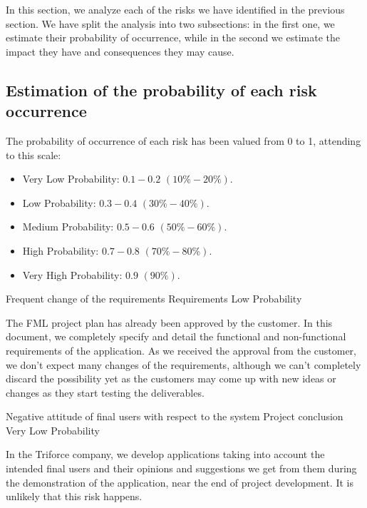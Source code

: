 
In this section, we analyze each of the risks we have identified in the previous section. We have split the analysis into two subsections: in the first one, we estimate their probability of occurrence, while in the second we estimate the impact they have and consequences they may cause.

\subsection{Estimation of the probability of each risk occurrence}
The probability of occurrence of each risk has been valued from 0 to 1, attending to this scale:
\begin{itemize}
\item Very Low Probability: $0.1-0.2$ $(10\%-20\%)$.
\item Low Probability: $0.3-0.4$ $(30\%-40\%)$.
\item Medium Probability: $0.5-0.6$ $(50\%-60\%)$.
\item High Probability: $0.7-0.8$ $(70\%-80\%)$.
\item Very High Probability: $0.9$ $(90\%)$.
\end{itemize}


\begin{risk}[riskReqChange]{Frequent change of the requirements}
\riskcat Requirements
 Low Probability

The FML project plan has already been approved by the customer. In this document, we completely specify and detail the functional and non-functional requirements of the application. As we received the approval from the customer, we don't expect many changes of the requirements, although we can't completely discard the possibility yet as the customers may come up with new ideas or changes as they start testing the deliverables.
\end{risk}

\begin{risk}[riskAttitude]{Negative attitude of final users with respect to the system}
\riskcat Project conclusion
 Very Low Probability

In the Triforce company, we develop applications taking into account the intended final users and their opinions and suggestions we get from them during the demonstration of the application, near the end of project development. It is unlikely that this risk happens.
\end{risk}

